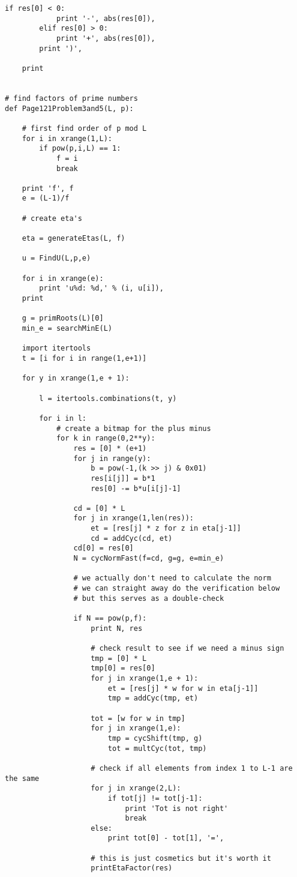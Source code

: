 \documentclass[aps,preprint,preprintnumbers,nofootinbib,showpacs,prd]{revtex4-1}
\begin{document}
\begin{Verbatim}[baselinestretch=0.75]
        if res[0] < 0:
            print '-', abs(res[0]),
        elif res[0] > 0:
            print '+', abs(res[0]),
        print ')',

    print
    

# find factors of prime numbers   
def Page121Problem3and5(L, p):

    # first find order of p mod L
    for i in xrange(1,L):
        if pow(p,i,L) == 1:
            f = i
            break

    print 'f', f
    e = (L-1)/f

    # create eta's

    eta = generateEtas(L, f)

    u = FindU(L,p,e)

    for i in xrange(e):
        print 'u%d: %d,' % (i, u[i]),
    print

    g = primRoots(L)[0]
    min_e = searchMinE(L)
    
    import itertools
    t = [i for i in range(1,e+1)]
    
    for y in xrange(1,e + 1):
        
        l = itertools.combinations(t, y)

        for i in l:
            # create a bitmap for the plus minus
            for k in range(0,2**y):
                res = [0] * (e+1)
                for j in range(y):
                    b = pow(-1,(k >> j) & 0x01)
                    res[i[j]] = b*1
                    res[0] -= b*u[i[j]-1]

                cd = [0] * L
                for j in xrange(1,len(res)):
                    et = [res[j] * z for z in eta[j-1]]
                    cd = addCyc(cd, et)
                cd[0] = res[0]
                N = cycNormFast(f=cd, g=g, e=min_e)

                # we actually don't need to calculate the norm
                # we can straight away do the verification below
                # but this serves as a double-check

                if N == pow(p,f):
                    print N, res
                    
                    # check result to see if we need a minus sign
                    tmp = [0] * L
                    tmp[0] = res[0]
                    for j in xrange(1,e + 1):
                        et = [res[j] * w for w in eta[j-1]]
                        tmp = addCyc(tmp, et)

                    tot = [w for w in tmp]
                    for j in xrange(1,e):
                        tmp = cycShift(tmp, g)
                        tot = multCyc(tot, tmp)

                    # check if all elements from index 1 to L-1 are the same
                    for j in xrange(2,L):
                        if tot[j] != tot[j-1]:
                            print 'Tot is not right'
                            break
                    else:
                        print tot[0] - tot[1], '=',

                    # this is just cosmetics but it's worth it
                    printEtaFactor(res)
\end{Verbatim}
\end{document}
